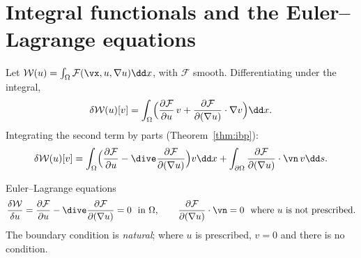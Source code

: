 \section{Integral functionals and the Euler--Lagrange equations}
Let $\mathcal W(u)=\int_\Omega\mathcal F(\vx,u,\nabla u)\dd x$, with
$\mathcal F$ smooth. Differentiating under the integral,
\[
  \delta\mathcal W(u)[v]=\int_\Omega\Bigl(\frac{\partial\mathcal F}{\partial u}\,v
  +\frac{\partial\mathcal F}{\partial(\nabla u)}\cdot\nabla v\Bigr)\dd x .
\]
Integrating the second term by parts (Theorem~\ref{thm:ibp}):
\[
  \delta\mathcal W(u)[v]=\int_\Omega\Bigl(\frac{\partial\mathcal F}{\partial u}
  -\dive\frac{\partial\mathcal F}{\partial(\nabla u)}\Bigr)v\dd x
  +\int_{\partial\Omega}\frac{\partial\mathcal F}{\partial(\nabla u)}\cdot\vn\,v\dd s .
\]
\begin{gbox}{Euler--Lagrange equations}
%
\begin{equation}\label{eq:EL}
  \frac{\delta\mathcal W}{\delta u}=\frac{\partial\mathcal F}{\partial u}
  -\dive\frac{\partial\mathcal F}{\partial(\nabla u)}=0\ \ \text{in }\Omega,
  \qquad
  \frac{\partial\mathcal F}{\partial(\nabla u)}\cdot\vn=0\ \ \text{where $u$ is not prescribed.}
\end{equation}
The boundary condition is \emph{natural}; where $u$ is prescribed, $v=0$ and
there is no condition.
\end{gbox}

